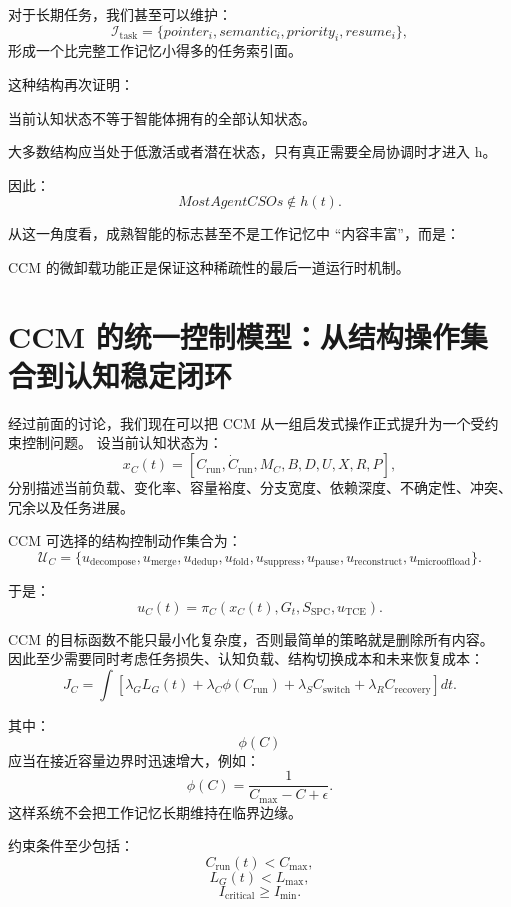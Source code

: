 对于长期任务，我们甚至可以维护：
\[
\mathcal I_{\mathrm{task}}
=
\{
pointer_i,
semantic_i,
priority_i,
resume_i
\},
\]
形成一个比完整工作记忆小得多的任务索引面。

这种结构再次证明：
\begin{statementbox}
当前认知状态不等于智能体拥有的全部认知状态。
\end{statementbox}
大多数结构应当处于低激活或者潜在状态，只有真正需要全局协调时才进入 h。

因此：
\[
MostAgentCSOs\notin h(t).
\]

从这一角度看，成熟智能的标志甚至不是工作记忆中 ``内容丰富''，而是：
\begin{statementbox}
\centering
{}
\end{statementbox}

CCM 的微卸载功能正是保证这种稀疏性的最后一道运行时机制。


\section{CCM 的统一控制模型：从结构操作集合到认知稳定闭环}

经过前面的讨论，我们现在可以把 CCM 从一组启发式操作正式提升为一个受约束控制问题。
设当前认知状态为：
\[
x_C(t)
=
[
C_{\mathrm{run}},
\dot C_{\mathrm{run}},
M_C,
B,
D,
U,
X,
R,
P
],
\]
分别描述当前负载、变化率、容量裕度、分支宽度、依赖深度、不确定性、冲突、冗余以及任务进展。

CCM 可选择的结构控制动作集合为：
\[
\mathcal U_C
=
\{
u_{\mathrm{decompose}},
u_{\mathrm{merge}},
u_{\mathrm{dedup}},
u_{\mathrm{fold}},
u_{\mathrm{suppress}},
u_{\mathrm{pause}},
u_{\mathrm{reconstruct}},
u_{\mathrm{microoffload}}
\}.
\]

于是：
\[
u_C(t)
=
\pi_C
\left(
x_C(t),
G_t,
S_{\mathrm{SPC}},
u_{\mathrm{TCE}}
\right).
\]

CCM 的目标函数不能只最小化复杂度，否则最简单的策略就是删除所有内容。
因此至少需要同时考虑任务损失、认知负载、结构切换成本和未来恢复成本：
\[
J_C
=
\int
\left[
\lambda_G L_G(t)
+
\lambda_C \phi(C_{\mathrm{run}})
+
\lambda_S C_{\mathrm{switch}}
+
\lambda_R C_{\mathrm{recovery}}
\right]
dt.
\]

其中：
\[
\phi(C)
\]
应当在接近容量边界时迅速增大，例如：
\[
\phi(C)
=
\frac{1}{
C_{\max}-C+\epsilon
}.
\]
这样系统不会把工作记忆长期维持在临界边缘。

约束条件至少包括：
\[
C_{\mathrm{run}}(t)
<
C_{\max},
\]
\[
L_G(t)
<
L_{\max},
\]
\[
I_{\mathrm{critical}}
\ge
I_{\min}.
\]

